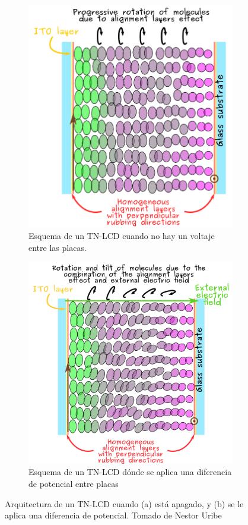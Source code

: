 \begin{figure}[h!]
\centering
\begin{subfigure}{.45\textwidth}
  \centering
  \includegraphics[width=.8\linewidth]{tn-lcd}
  \caption{Esquema de un TN-LCD cuando no hay un voltaje entre las placas.}
  \label{fig:tn-lc}
\end{subfigure}\qquad
\begin{subfigure}{.45\textwidth}
  \centering
  \includegraphics[width=.8\linewidth]{tn-lcd-voltage}
  \caption{Esquema de un TN-LCD dónde se aplica una diferencia de
    potencial entre placas}
  \label{fig:tn-lc-voltage}
\end{subfigure}
\caption[Arquitectura de un TN-LCD]{Arquitectura de un TN-LCD cuando (a) está apagado, y (b) se
  le aplica una diferencia de potencial. Tomado de Nestor Uribe }
  \label{fig:tn-lcd}
\end{figure} 


